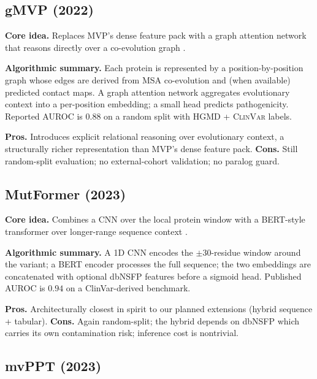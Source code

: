 \documentclass[11pt,a4paper,oneside]{report}
\begin{document}
\subsection{gMVP (2022) \texorpdfstring{\citep{zhang2022gmvp}}{(Zhang et al., 2022)}}
\label{sec:rw-gmvp}

\textbf{Core idea.} Replaces MVP's dense feature pack with a graph
attention network that reasons directly over a co-evolution graph
\citep{zhang2022gmvp}.

\textbf{Algorithmic summary.} Each protein is represented by a
position-by-position graph whose edges are derived from MSA
co-evolution and (when available) predicted contact maps. A graph
attention network aggregates evolutionary context into a
per-position embedding; a small head predicts pathogenicity. Reported
AUROC is $0.88$ on a random split with HGMD + \textsc{ClinVar} labels.

\textbf{Pros.} Introduces explicit relational reasoning over
evolutionary context, a structurally richer representation than
MVP's dense feature pack. \textbf{Cons.} Still random-split
evaluation; no external-cohort validation; no paralog guard.

\subsection{MutFormer (2023) \texorpdfstring{\citep{jiang2023mutformer}}{(Jiang et al., 2023)}}
\label{sec:rw-mutformer}

\textbf{Core idea.} Combines a CNN over the local protein window with a
BERT-style transformer over longer-range sequence context
\citep{jiang2023mutformer}.

\textbf{Algorithmic summary.} A 1D CNN encodes the $\pm 30$-residue
window around the variant; a BERT encoder processes the full
sequence; the two embeddings are concatenated with optional dbNSFP
features before a sigmoid head. Published AUROC is $0.94$ on a
ClinVar-derived benchmark.

\textbf{Pros.} Architecturally closest in spirit to our planned extensions
(hybrid sequence + tabular). \textbf{Cons.} Again random-split; the
hybrid depends on dbNSFP which carries its own contamination risk;
inference cost is nontrivial.

\subsection{mvPPT (2023) \texorpdfstring{\citep{tong2023mvppt}}{(Tong et al., 2023)}}
\label{sec:rw-mvppt}
\end{document}
